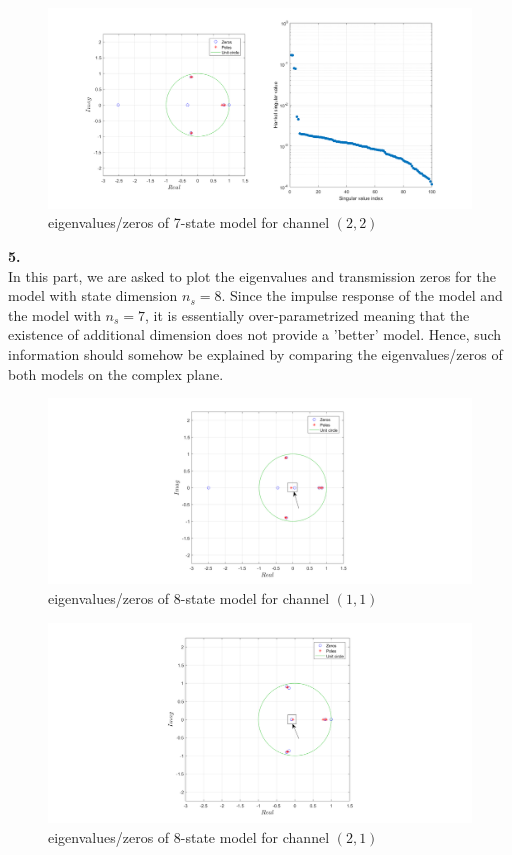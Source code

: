 \documentclass[paper=US leter, fontsize=11pt]{scrartcl}
\begin{document}
\begin{figure}[t!]  
	\centering    
	\includegraphics[scale=0.38,trim={4.5cm 0 0 0},clip]{task244.png}  
	\caption{eigenvalues/zeros of 7-state model for channel $(2,2)$}
	\label{task244} 
\end{figure} 
\clearpage
\textbf{5.}\\
In this part, we are asked to plot the eigenvalues and transmission zeros for the model with state dimension $n_{s}=8$. Since the impulse response of the model and the model with $n_{s}=7$, it is essentially over-parametrized meaning that the existence of additional dimension does not provide a 'better' model. Hence, such information should somehow be explained by comparing the eigenvalues/zeros of both models on the complex plane.
 


\begin{figure}[bh!]  
	\centering    
	\includegraphics[scale=0.38,trim={4.5cm 0 0 0},clip]{task251.png}  
	\caption{eigenvalues/zeros of 8-state model for channel $(1,1)$}
	\label{task251} 
\end{figure} 

\begin{figure}[ht!]  
	\centering    
	\includegraphics[scale=0.38,trim={4.5cm 0 0 0},clip]{task253.png}  
	\caption{eigenvalues/zeros of 8-state model for channel $(2,1)$}
	\label{task252} 
\end{figure} 
\end{document}
